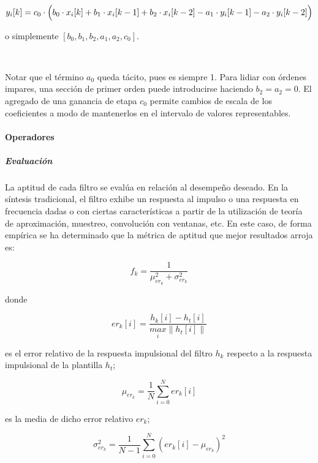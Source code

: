 \documentclass[11pt]{article}
\begin{document}
\begin{equation}
y_i[k] = c_0 \cdot \Bigl( b_0 \cdot x_i[k] + b_1 \cdot x_i[k-1] + b_2 \cdot x_i[k-2] - a_1 \cdot y_i[k-1] - a_2 \cdot y_i[k-2] \Bigr)
\end{equation}


o simplemente \([b_0, b_1, b_2, a_1, a_2, c_0]\).

    
    \begin{center}
    \end{center}
    { \hspace*{\fill} \\}
    

    Notar que el término \(a_0\) queda tácito, pues es siempre 1. Para
lidiar con órdenes impares, una sección de primer orden puede
introducirse haciendo \(b_2 = a_2 = 0\). El agregado de una ganancia de
etapa \(c_0\) permite cambios de escala de los coeficientes a modo de
mantenerlos en el intervalo de valores representables.

\paragraph{Operadores}\label{operadores}

\subparagraph{Evaluación}\label{evaluaciuxf3n}

La aptitud de cada filtro se evalúa en relación al desempeño deseado. En
la síntesis tradicional, el filtro exhibe un respuesta al impulso o una
respuesta en frecuencia dadas o con ciertas características a partir de
la utilización de teoría de aproximación, muestreo, convolución con
ventanas, etc. En este caso, de forma empírica se ha determinado que la
métrica de aptitud que mejor resultados arroja es:

\[
f_k = \frac{1}{\mu_{er_k}^2 + \sigma_{er_k}^2}
\]

donde

\[
er_k[i] = \frac{h_k[i] - h_t[i]}{\underset{i}{max} \|h_t[i]\|}
\]

es el error relativo de la respuesta impulsional del filtro \(h_k\)
respecto a la respuesta impulsional de la plantilla \(h_t\);

\[
\mu_{er_k} = \frac{1}{N} \sum^N_{i = 0} er_k[i]
\]

es la media de dicho error relativo \(er_k\);

\[
\sigma^2_{er_k} = \frac{1}{N - 1} \sum^N_{i = 0} (er_k[i] - \mu_{er_k})^2
\]
\end{document}
